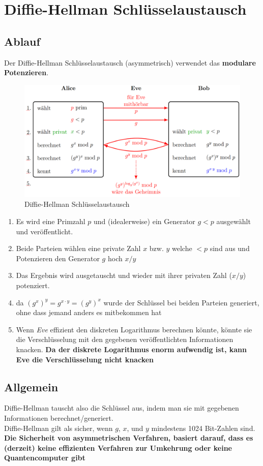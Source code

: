 \chapter{Diffie-Hellman Schlüsselaustausch}
\section{Ablauf}
Der Diffie-Hellman Schlüsselaustausch (asymmetrisch) verwendet das \textbf{modulare Potenzieren}.

\begin{figure}[H]
	\centering
	\includegraphics[width=1.0\linewidth]{figures/diffhell.png}
	\caption{Diffie-Hellman Schlüsselaustausch}
\end{figure}
\begin{enumerate}
	\item Es wird eine Primzahl $p$ und (idealerweise) ein Generator $g < p$ ausgewählt und veröffentlicht.
	\item Beide Parteien wählen eine private Zahl $x$ bzw. $y$ welche $< p$ sind aus und Potenzieren den Generator $g$ hoch $x/y$
	\item Das Ergebnis wird ausgetauscht und wieder mit ihrer privaten Zahl ($x/y$) potenziert.
	\item da $(g^x)^y = g^{x \cdot y} = (g^y)^x$ wurde der Schlüssel bei beiden Parteien generiert, ohne dass jemand anders es mitbekommen hat
	\item Wenn \textit{Eve} effizient den diskreten Logarithmus berechnen könnte, könnte sie die Verschlüsselung mit den gegebenen veröffentlichten Informationen knacken. \textbf{Da der diskrete Logarithmus enorm aufwendig ist, kann Eve die Verschlüsselung nicht knacken}
\end{enumerate}

\section{Allgemein}
Diffie-Hellman tauscht also die Schlüssel aus, indem man sie mit gegebenen Informationen berechnet/generiert. \\
Diffie-Hellman gilt als sicher, wenn $g$, $x$, und $y$ mindestens 1024 Bit-Zahlen sind. \\
\textbf{Die Sicherheit von asymmetrischen Verfahren, basiert darauf, dass es (derzeit) keine effizienten Verfahren zur Umkehrung oder keine Quantencomputer gibt}

